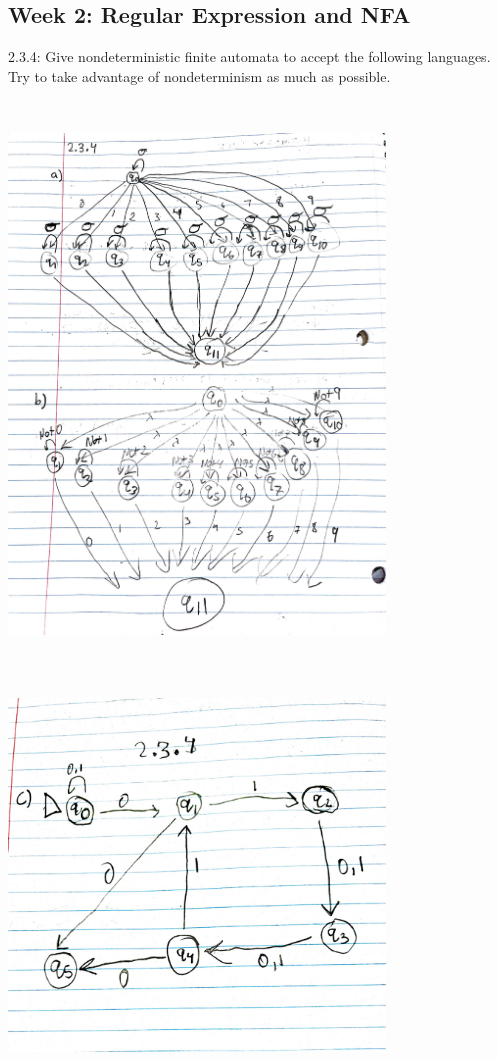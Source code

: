 \documentclass{article}
\theoremstyle{theorem}
\theoremstyle{definition}
\theoremstyle{remark}
\begin{document}
\subsection{Week 2: Regular Expression and NFA}
2.3.4: Give nondeterministic finite automata to accept the following languages. Try to take advantage of nondeterminism as much as possible. 
\medskip\begin{center}
\includegraphics[width=10cm, height=15cm]{Week2_2.3.4ab.pdf}
\end{center}

\medskip\begin{center}
\includegraphics[width=10cm, height=10cm]{Week2_2.3.4c.pdf}
\end{center}
\end{document}
